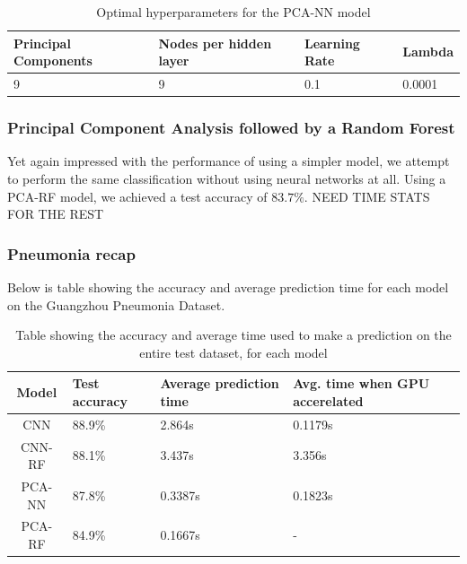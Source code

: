 \documentclass[onecolumn,10pt,cleanfoot]{asme2ej}
\begin{document}
\begin{table}[H]
\caption{Optimal hyperparameters for the PCA-NN model}
\begin{center}
\label{pcanntable}
\begin{tabular}{| l | l | l | l |}
\hline
Principal Components & Nodes per hidden layer & Learning Rate & Lambda \\
\hline
9 & 9 & 0.1 & 0.0001 \\
\hline
\end{tabular}
\end{center}
\end{table}


\subsubsection{Principal Component Analysis followed by a Random Forest}

Yet again impressed with the performance of using a simpler model, we attempt to perform the same classification without using neural networks at all. Using a PCA-RF model, we achieved a test accuracy of $83.7\%$. NEED TIME STATS FOR THE REST

\subsubsection{Pneumonia recap}

Below is table showing the accuracy and average prediction time for each model on the Guangzhou Pneumonia Dataset.

\begin{table}[H]
\caption{Table showing the accuracy and average time used to make a prediction on the entire test dataset, for each model}
\begin{center}
\label{pcanntable}
\begin{tabular}{| c | l | l | l |}
\hline
Model & Test accuracy & Average prediction time & Avg. time when GPU accerelated \\
\hline
CNN & 88.9\% & 2.864s & 0.1179s \\
CNN-RF & 88.1\% & 3.437s & 3.356s \\
PCA-NN & 87.8\% & 0.3387s & 0.1823s \\
PCA-RF & 84.9\% & 0.1667s & - \\
\hline
\end{tabular}
\end{center}
\end{table}
\end{document}
